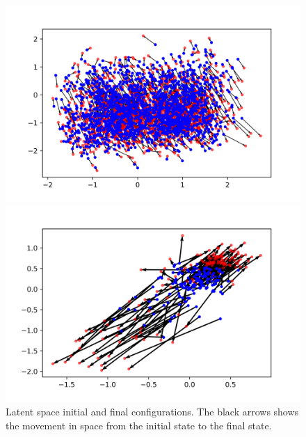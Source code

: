 \documentclass[mscthesis]{usiinfthesis}
\begin{document}
\begin{figure}[H] 
  \begin{minipage}[b]{0.5\linewidth}
    \centering
    \includegraphics[width=\linewidth]{latentspace_species.png} 
    \vspace{4ex}
  \end{minipage}%
  \begin{minipage}[b]{0.5\linewidth}
    \centering
    \includegraphics[width=\linewidth]{latentspace_region.png} 
    \vspace{4ex}
  \end{minipage}  
\caption{Latent space initial and final configurations. The black arrows shows the movement in space from the initial state to the final state.}
\label{fig:latentspace_config}
\end{figure}
\end{document}

